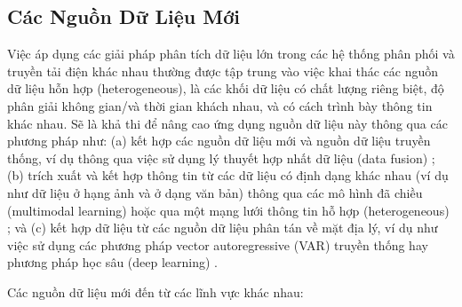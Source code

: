 \documentclass[utf8]{frontiersSCNS} %
\begin{document}
\subsection{Các Nguồn Dữ Liệu Mới}
Việc áp dụng các giải pháp phân tích dữ liệu lớn trong các hệ thống phân phối và truyền tải điện khác nhau thường được tập trung vào việc khai thác các nguồn dữ liệu hỗn hợp (heterogeneous), là các khối dữ liệu có chất lượng riêng biệt, độ phân giải không gian/và thời gian khách nhau, và có cách trình bày thông tin khác nhau. Sẽ là khả thi để nâng cao ứng dụng nguồn dữ liệu này thông qua các phương pháp như: (a) kết hợp các nguồn dữ liệu mới và nguồn dữ liệu truyền thống, ví dụ thông qua việc sử dụng lý thuyết hợp nhất dữ liệu (data fusion) \citep{SimoesCosta2013}; (b) trích xuất và kết hợp thông tin từ các dữ liệu có định dạng khác nhau (ví dụ như dữ liệu ở hạng ảnh và ở dạng văn bản) thông qua các mô hình đã chiều (multimodal learning) \citep{Srivastava2012} hoặc qua một mạng lưới thông tin hỗ hợp (heterogeneous) \citep{Sun2016}; và (c) kết hợp dữ liệu từ các nguồn dữ liệu phân tán về mặt địa lý, ví dụ như việc sử dụng các phương pháp vector autoregressive (VAR) truyền thống \citep{Cavalcante2017} hay phương pháp học sâu (deep learning) \citep{Zhu2020}.

Các nguồn dữ liệu mới đến từ các lĩnh vực khác nhau:
\end{document}
